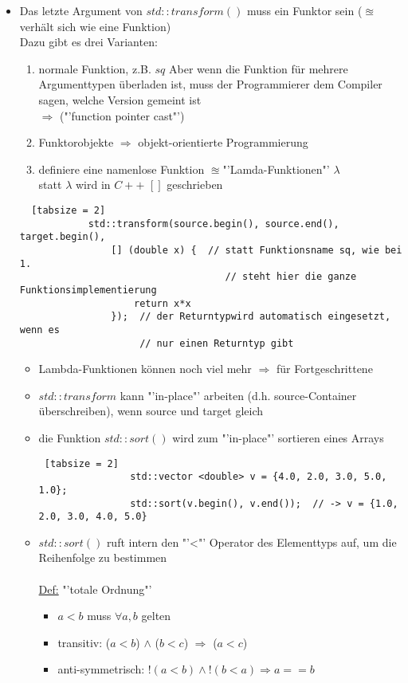 \documentclass{article}
\begin{document}
\begin{itemize}
	\item Das letzte Argument von $std::transform()$ muss ein Funktor sein ($\approxeq$ verhält sich wie eine Funktion) \\
	Dazu gibt es drei Varianten:
		\begin{enumerate}
			\item normale Funktion, z.B. $sq$ Aber wenn die Funktion für mehrere Argumenttypen überladen ist, muss der Programmierer dem Compiler sagen, welche Version gemeint ist \\ $\Rightarrow$ ("'function pointer cast"')
			\item  Funktorobjekte $\Rightarrow$ objekt-orientierte Programmierung
			\item definiere eine namenlose Funktion $\approxeq$"'Lamda-Funktionen"' $\lambda$ \\
			statt $\lambda$ wird in $C++$ $[]$ geschrieben
		\end{enumerate}
		\begin{lstlisting} 	[tabsize = 2]
			std::transform(source.begin(), source.end(), target.begin(), 
				[] (double x) {  // statt Funktionsname sq, wie bei 1. 
									// steht hier die ganze Funktionsimplementierung
					return x*x
				});  // der Returntypwird automatisch eingesetzt, wenn es 
					 // nur einen Returntyp gibt
		\end{lstlisting}
		\begin{itemize}
			\item Lambda-Funktionen können noch viel mehr $\Rightarrow$ für Fortgeschrittene
			\item $std::transform$ kann "'in-place"' arbeiten (d.h. source-Container überschreiben), wenn source und target gleich
			\item die Funktion $std::sort()$ wird zum "'in-place"' sortieren eines Arrays
			\begin{lstlisting} [tabsize = 2]
				std::vector <double> v = {4.0, 2.0, 3.0, 5.0, 1.0};
				std::sort(v.begin(), v.end());  // -> v = {1.0, 2.0, 3.0, 4.0, 5.0}
			\end{lstlisting}
			
			\item $std::sort()$ ruft intern den "'<"' Operator des Elementtyps auf, um die Reihenfolge zu bestimmen \\ \\
			\underline{Def:} "'totale Ordnung"'
			\begin{itemize}
				\item $a<b$ muss $\forall a,b$ gelten
				\item transitiv: ($a<b$) $\wedge$ ($b<c$) $\Rightarrow$ ($a<c$)
				\item anti-symmetrisch: $!(a<b) \wedge !(b<a) \Rightarrow a ==b$
			\end{itemize}
		\end{itemize}
	\end{itemize}
	
\end{document}
